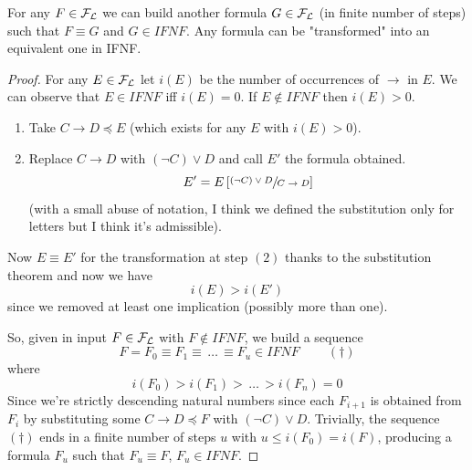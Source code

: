 	\begin{lemma}
	For any $F \in \mathcal{F}_\mathcal{L}$ we can build another formula $G \in \mathcal{F}_\mathcal{L}$ (in finite number of steps) such that $F \equiv G$ and $G \in IFNF$. Any formula can be "transformed" into an equivalent one in IFNF.
	\end{lemma}
	\begin{proof}
		For any $E \in \mathcal{F}_\mathcal{L}$ let $i(E)$ be the number of occurrences of $\rightarrow$ in $E$. We can observe that $E \in IFNF$ iff $i(E) = 0$. If $E \notin IFNF$ then $i(E) > 0$.

	\begin{enumerate}
		\item Take $C \rightarrow D \preceq E$ (which exists for any $E$ with $i(E) > 0$).

		\item Replace $C \rightarrow D$ with $(\neg C) \vee D$ and call $E'$ the formula obtained.
		$$ E' = E\left[\sfrac{(\neg C) \vee D}{C \rightarrow D}\right]$$
		(with a small abuse of notation, I think we defined the substitution only for letters but I think it's admissible).
	\end{enumerate}

		\noindent
		Now $E \equiv E'$ for the transformation at step $(2)$ thanks to the substitution theorem and now we have
		$$ i(E) > i(E')$$
		since we removed at least one implication (possibly more than one).

		So, given in input $F \in \mathcal{F}_\mathcal{L}$ with $F \notin IFNF$, we build a sequence
		$$ F = F_0 \equiv F_1\equiv \, \dots \, \equiv F_u \in IFNF \;\;\;\;\;\;\;\; (\dag) $$
		where
		$$ i(F_0) > i(F_1) > \, \dots \, > i(F_n) = 0 $$
		Since we're strictly descending natural numbers since each $F_{i+1}$ is obtained from $F_i$ by substituting some $C \rightarrow D \preceq F$ with $(\neg C) \vee D$. Trivially, the sequence $(\dag)$ ends in a finite number of steps $u$ with $u \leq i(F_0) = i(F)$, producing a formula $F_u$ such that $F_u \equiv F$, $F_u \in IFNF$.
	\end{proof}

